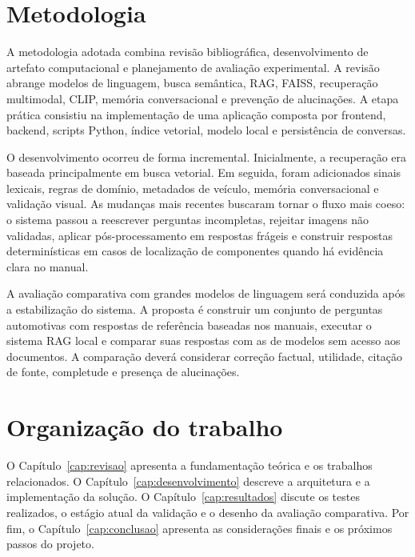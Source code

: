 \section{Metodologia}
\label{sec:metodologia}

A metodologia adotada combina revisão bibliográfica, desenvolvimento de artefato computacional e planejamento de avaliação experimental. A revisão abrange modelos de linguagem, busca semântica, RAG, FAISS, recuperação multimodal, CLIP, memória conversacional e prevenção de alucinações. A etapa prática consistiu na implementação de uma aplicação composta por frontend, backend, scripts Python, índice vetorial, modelo local e persistência de conversas.

O desenvolvimento ocorreu de forma incremental. Inicialmente, a recuperação era baseada principalmente em busca vetorial. Em seguida, foram adicionados sinais lexicais, regras de domínio, metadados de veículo, memória conversacional e validação visual. As mudanças mais recentes buscaram tornar o fluxo mais coeso: o sistema passou a reescrever perguntas incompletas, rejeitar imagens não validadas, aplicar pós-processamento em respostas frágeis e construir respostas determinísticas em casos de localização de componentes quando há evidência clara no manual.

A avaliação comparativa com grandes modelos de linguagem será conduzida após a estabilização do sistema. A proposta é construir um conjunto de perguntas automotivas com respostas de referência baseadas nos manuais, executar o sistema RAG local e comparar suas respostas com as de modelos sem acesso aos documentos. A comparação deverá considerar correção factual, utilidade, citação de fonte, completude e presença de alucinações.

\section{Organização do trabalho}

O Capítulo~\ref{cap:revisao} apresenta a fundamentação teórica e os trabalhos relacionados. O Capítulo~\ref{cap:desenvolvimento} descreve a arquitetura e a implementação da solução. O Capítulo~\ref{cap:resultados} discute os testes realizados, o estágio atual da validação e o desenho da avaliação comparativa. Por fim, o Capítulo~\ref{cap:conclusao} apresenta as considerações finais e os próximos passos do projeto.

